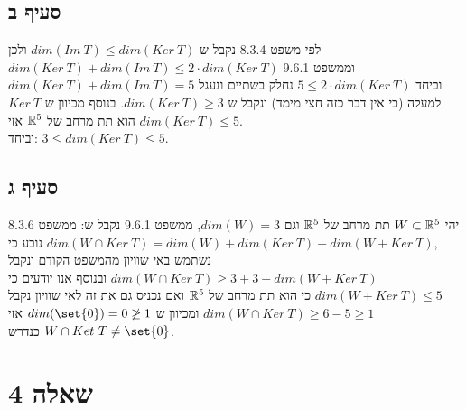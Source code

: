 \documentclass{article}
\DeclarePairedDelimiter\set\{\}
\begin{document}
	\subsection*{סעיף ב}
	לפי משפט 8.3.4 נקבל ש $dim(Im \ T) \leq dim(Ker \ T)$ ולכן \\
	$dim(Ker \ T) + dim(Im \ T) \leq 2 \cdot dim(Ker \ T)$ וממשפט 9.6.1 \\
	$dim(Ker \ T) + dim(Im \ T) = 5$ וביחד $5 \leq 2 \cdot dim(Ker \ T)$ נחלק בשתיים ונעגל למעלה (כי אין דבר כזה חצי מימד) ונקבל ש $dim(Ker \ T) \geq 3$.
	בנוסף מכיוון ש $Ker \ T$ הוא תת מרחב של $\mathbb{R}^5$ אזי $dim(Ker \ T) \leq 5$. \\
	וביחד: $3 \leq dim(Ker \ T) \leq 5$.

	\subsection*{סעיף ג}
	יהי $W \subset \mathbb{R}^5$ תת מרחב של $\mathbb{R}^5$ וגם $dim(W) = 3$, ממשפט 9.6.1 נקבל ש:
	ממשפט 8.3.6 נובע כי $dim(W \cap Ker \ T) = dim(W) + dim(Ker \ T) - dim(W + Ker \ T)$, \\
	נשתמש באי שוויון מהמשפט הקודם ונקבל $dim(W \cap Ker \ T) \geq 3 + 3 - dim(W + Ker \ T)$
	ובנוסף אנו יודעים כי $dim(W + Ker \ T) \leq 5$ כי הוא תת מרחב של $\mathbb{R}^5$ ואם נכניס גם את זה לאי שוויון נקבל $dim(W \cap Ker \ T) \geq 6 -5 \geq 1$
	ומכיוון ש $dim(\set{0}) = 0 \not \geq 1$ אזי $W \cap Ket \ T \neq \set{0}$ כנדרש.

	\pagebreak
	\section*{שאלה 4}
\end{document}
